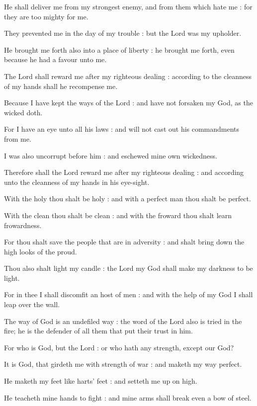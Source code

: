He shall deliver me from my strongest enemy, and from them which hate me : for they are too mighty for me.\par
{}They prevented me in the day of my trouble : but the Lord was my upholder.\par
{}He brought me forth also into a place of liberty : he brought me forth, even because he had a favour unto me.\par
{}The Lord shall reward me after my righteous dealing : according to the cleanness of my hands shall he recompense me.\par
{}Because I have kept the ways of the Lord : and have not forsaken my God, as the wicked doth.\par
{}For I have an eye unto all his laws : and will not cast out his commandments from me.\par
{}I was also uncorrupt before him : and eschewed mine own wickedness.\par
{}Therefore shall the Lord reward me after my righteous dealing : and according unto the cleanness of my hands in his eye-sight.\par
{}With the holy thou shalt be holy : and with a perfect man thou shalt be perfect.\par
{}With the clean thou shalt be clean : and with the froward thou shalt learn frowardness.\par
{}For thou shalt save the people that are in adversity : and shalt bring down the high looks of the proud.\par
{}Thou also shalt light my candle : the Lord my God shall make my darkness to be light.\par
{}For in thee I shall discomfit an host of men : and with the help of my God I shall leap over the wall.\par
{}The way of God is an undefiled way : the word of the Lord also is tried in the fire; he is the defender of all them that put their trust in him.\par
{}For who is God, but the Lord : or who hath any strength, except our God?\par
{}It is God, that girdeth me with strength of war : and maketh my way perfect.\par
{}He maketh my feet like harts' feet : and setteth me up on high.\par
{}He teacheth mine hands to fight : and mine arms shall break even a bow of steel.\par
